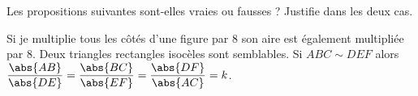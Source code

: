 %
%
    Les propositions suivantes sont-elles vraies ou fausses ? Justifie dans les deux cas.
    \begin{tasks}
        \task Si je multiplie tous les côtés d'une figure par 8 son aire est également multipliée par 8.
        \task Deux triangles rectangles isocèles sont semblables.
        \task Si \(ABC \sim DEF\) alors \(\dfrac{\abs{AB}}{\abs{DE}} = \dfrac{\abs{BC}}{\abs{EF}} = \dfrac{\abs{DF}}{\abs{AC}} = k\).
    \end{tasks}
